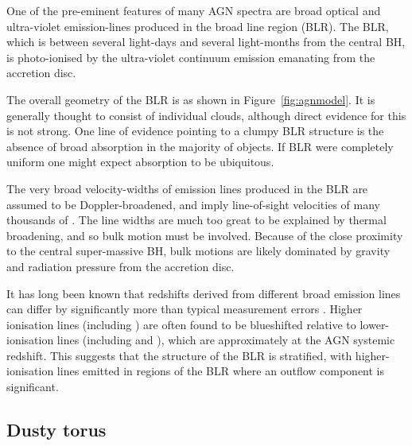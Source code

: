 One of the pre-eminent features of many AGN spectra are broad optical and ultra-violet emission-lines produced in the broad line region (BLR).
The BLR, which is between several light-days and several light-months from the central BH, is photo-ionised by the ultra-violet continuum emission emanating from the accretion disc.

The overall geometry of the BLR is as shown in Figure~\ref{fig:agnmodel}.
It is generally thought to consist of individual clouds, although direct evidence for this is not strong.
One line of evidence pointing to a clumpy BLR structure is the absence of broad  absorption in the majority of objects.
If BLR were completely uniform one might expect  absorption to be ubiquitous.

The very broad velocity-widths of emission lines produced in the BLR are assumed to be Doppler-broadened, and imply line-of-sight velocities of many thousands of \kms.
The line widths are much too great to be explained by thermal broadening, and so bulk motion must be involved.
Because of the close proximity to the central super-massive BH, bulk motions are likely dominated by gravity and radiation pressure from the accretion disc.

It has long been known that redshifts derived from different broad emission lines can differ by significantly more than typical measurement errors \citep[e.g.][]{gaskell82}.
Higher ionisation lines (including ) are often found to be blueshifted relative to lower-ionisation lines (including  and \hbns), which are approximately at the AGN systemic redshift.
This suggests that the structure of the BLR is stratified, with higher-ionisation lines emitted in regions of the BLR where an outflow component is significant.

\subsection{Dusty torus}

